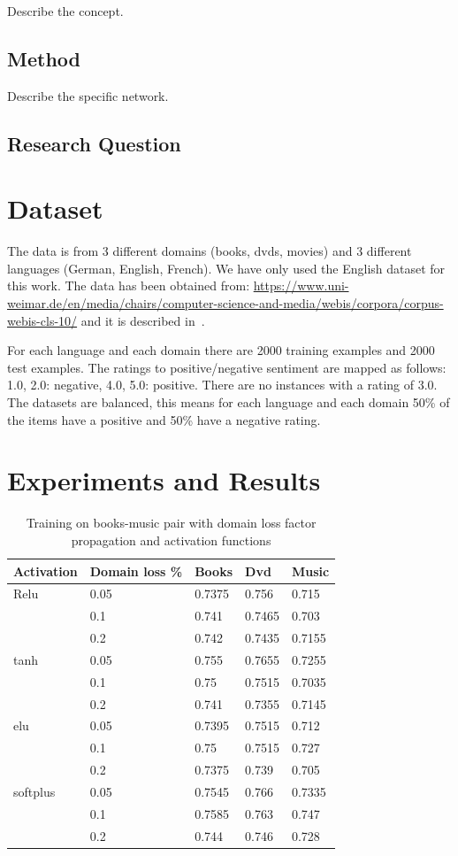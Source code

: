 \documentclass[11pt,a4paper]{article}
\begin{document}
Describe the concept.

\subsection{Method}
Describe the specific network.

\subsection{Research Question}

\section{Dataset}
The data is from 3 different domains (books, dvds, movies) and 3 different languages (German, English, French).
We have only used the English dataset for this work. The data has been obtained from: \url{https://www.uni-weimar.de/en/media/chairs/computer-science-and-media/webis/corpora/corpus-webis-cls-10/} and it is described in~\cite{PB:2010}.

For each language and each domain there are 2000 training examples and 2000 test examples. The ratings to positive/negative sentiment are mapped as follows: 1.0, 2.0: negative, 4.0, 5.0: positive. There are no instances with a rating of 3.0. The datasets are balanced, this means for each language and each domain 50\% of the items have a positive and 50\% have a negative rating.

\section{Experiments and Results}

\begin{table}[h]
\begin{center}
\begin{tabular}{|l|l|l|l|l|}
\hline Activation & Domain loss \% & Books & Dvd & Music \\ \hline
Relu & 0.05 & 0.7375 & 0.756 & 0.715  \\
 & 0.1 & 0.741 & 0.7465 & 0.703 \\
 & 0.2 & 0.742 & 0.7435 & 0.7155 \\
\hline
tanh & 0.05 & 0.755 & 0.7655 & 0.7255 \\
 & 0.1 & 0.75 & 0.7515 & 0.7035 \\
 & 0.2 & 0.741 & 0.7355 & 0.7145 \\
\hline
elu & 0.05 & 0.7395 & 0.7515 & 0.712 \\
 & 0.1 & 0.75 & 0.7515 & 0.727 \\
 & 0.2 & 0.7375 & 0.739 & 0.705 \\
\hline
softplus & 0.05 & 0.7545 & 0.766 & 0.7335 \\
 & 0.1 & 0.7585 & 0.763 & 0.747 \\
 & 0.2 & 0.744 & 0.746 & 0.728 \\
\hline
\end{tabular}
\end{center}
\caption{ Training on books-music pair with domain loss factor propagation and activation functions}
\label{dd-table}
\end{table}
\end{document}
